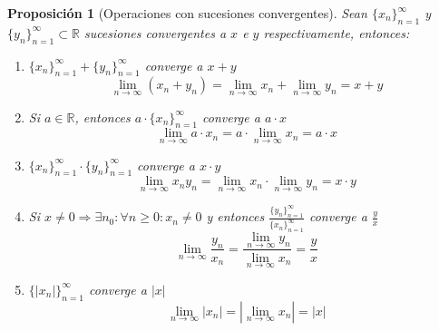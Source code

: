 \documentclass[10pt,a4paper,openright]{book}
\theoremstyle{break}
\newtheorem{prop}{Proposición}[chapter]
\begin{document}
\begin{prop}[Operaciones con sucesiones convergentes]
Sean $\{x_n\}_{n=1}^\infty$ y $\{y_n\}_{n=1}^\infty \subset \mathbb R$ sucesiones convergentes a $x$ e $y$ respectivamente, entonces:
\begin{enumerate}
\item $\{x_n\}_{n=1}^\infty+\{y_n\}_{n=1}^\infty$ converge a $x+y$
$$\lim_{n\rightarrow \infty}(x_n+y_n)=\lim_{n\rightarrow \infty} x_n + \lim_{n\rightarrow \infty} y_n = x+y$$

\item Si $a\in \mathbb R$, entonces $a\cdot \{x_n\}_{n=1}^\infty$ converge a $a\cdot x$
$$\lim_{n\rightarrow \infty} a\cdot x_n=a\cdot \lim_{n\rightarrow \infty} x_n=a \cdot x$$

\item $\{x_n\}_{n=1}^\infty\cdot \{y_n\}_{n=1}^\infty$ converge a $x\cdot y$
$$\lim_{n\rightarrow \infty} x_n y_n= \lim_{n\rightarrow \infty} x_n \cdot \lim_{n\rightarrow \infty} y_n= x\cdot y$$

\item Si $x\neq 0\Rightarrow \exists n_0: \forall n\geq 0: x_n\neq 0$ y entonces $\frac{\{y_n\}_{n=1}^\infty}{\{x_n\}_{n=1}^\infty}$ converge a $\frac{y}{x}$
$$\lim_{n\rightarrow \infty}\frac{y_n}{x_n}=\frac{\lim_{n\rightarrow \infty} y_n}{\lim_{n\rightarrow \infty} x_n}=\frac{y}{x}$$

\item $\{|x_n|\}_{n=1}^\infty$ converge a $|x|$
$$\lim_{n\rightarrow \infty} |x_n|=\left|\lim_{n\rightarrow \infty} x_n\right|=|x|$$
\end{enumerate}
\end{prop}
\end{document}

